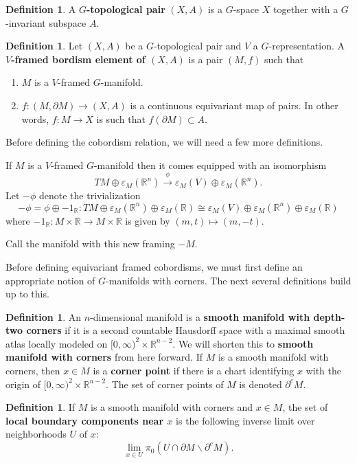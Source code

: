 \documentclass[11pt]{amsart}
\newcommand{\R}{\mathbb R}
\theoremstyle{plain}   %
\theoremstyle{definition}
\newtheorem{df}[thm]{Definition}
\theoremstyle{remark}
\numberwithin{equation}{section}
\begin{document}
\begin{df}\label{df:pair}
A \textbf{$G$-topological pair} $(X,A)$ is a $G$-space $X$ together with a $G$-invariant subspace $A$.
\end{df}

\begin{df}
Let $(X,A)$ be a $G$-topological pair and $V$ a $G$-representation. A \textbf{$V$-framed bordism element of $(X,A)$} is a pair $(M,f)$ such that
\begin{enumerate}
\item $M$ is a $V$-framed $G$-manifold. 
\item $f:(M,\partial M)\to (X,A)$ is a continuous equivariant map of pairs. In other words, $f:M\to X$ is such that $f(\partial M)\subset A$. 
\end{enumerate}
\end{df}

Before defining the cobordism relation, we will need a few more definitions.

If $M$ is a $V$-framed $G$-manifold then it comes equipped with an isomorphism
\[
TM\oplus\varepsilon_M(\R^n)\xrightarrow{\phi} \varepsilon_M(V)\oplus \varepsilon_M(\R^n).
\]
Let $-\phi$ denote the trivialization
\[
-\phi = \phi\oplus -1_\R: TM\oplus \varepsilon_M(\R^n)\oplus\varepsilon_M(\R) \cong \varepsilon_M(V)\oplus \varepsilon_M(\R^n)\oplus \varepsilon_M(\R)
\]
where $-1_\R:M\times \R\to M\times\R$ is given by $(m,t)\mapsto (m,-t)$. 

Call the manifold with this new framing $-M$. 

Before defining equivariant framed cobordisms, we must first define an appropriate notion of $G$-manifolds with corners. The next several definitions build up to this.

\begin{df}
An $n$-dimensional manifold is a \textbf{smooth manifold with depth-two corners} if it is a second countable Hausdorff space with a maximal smooth atlas locally modeled on $[0,\infty)^2\times \R^{n-2}$. We will shorten this to \textbf{smooth manifold with corners} from here forward. If $M$ is a smooth manifold with corners, then $x\in M$ is a \textbf{corner point} if there is a chart identifying $x$ with the origin of $[0,\infty)^2\times\R^{n-2}$. The set of corner points of $M$ is denoted $\partial^cM$. 
\end{df}

\begin{df}
If $M$ is a smooth manifold with corners and $x\in M$, the set of \textbf{local boundary components near $x$} is the following inverse limit over neighborhoods $U$ of $x$:
\[
\underset{x\in U}{\lim}\pi_0(U\cap \partial M\backslash \partial^c M).
\]
\end{df}
\end{document}
